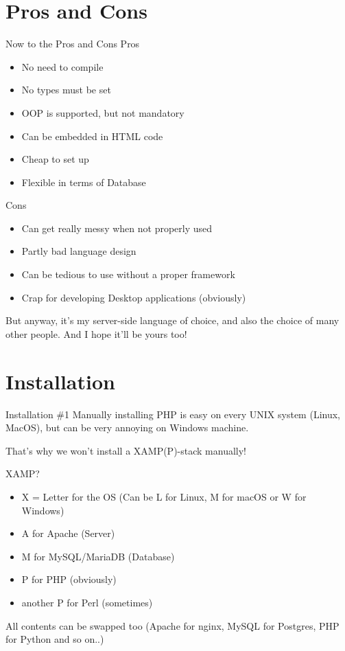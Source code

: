 \section{Pros and Cons}
\begin{frame}{Now to the Pros and Cons}
	Pros
	\begin{itemize}
		\item No need to compile \pause
		\item No types must be set \pause
		\item OOP is supported, but not mandatory \pause
		\item Can be embedded in HTML code \pause
		\item Cheap to set up \pause
		\item Flexible in terms of Database \pause
	\end{itemize}
	
	Cons
	\begin{itemize}
		\item Can get really messy when not properly used \pause
		\item Partly bad language design \pause
		\item Can be tedious to use without a proper framework \pause
		\item Crap for developing Desktop applications (obviously) \pause
	\end{itemize}
	
	But anyway, it's my server-side language of choice, and also the choice of many other people. And I hope it'll be yours too!
\end{frame}

\section{Installation}
\begin{frame}{Installation \#{}1}
	Manually installing PHP is easy on every UNIX system (Linux, MacOS), but can be very annoying on Windows machine. \pause
	
	That's why we won't install a XAMP(P)-stack manually! \pause
	
	XAMP?\pause
	\begin{itemize}
		\item X = Letter for the OS (Can be L for Linux, M for macOS or W for Windows) \pause
		\item A for Apache (Server) \pause
		\item M for MySQL/MariaDB (Database) \pause
		\item P for PHP (obviously) \pause
		\item another P for Perl (sometimes) \pause
	\end{itemize}
	
	All contents can be swapped too (Apache for nginx, MySQL for Postgres, PHP for Python and so on..)
\end{frame}

